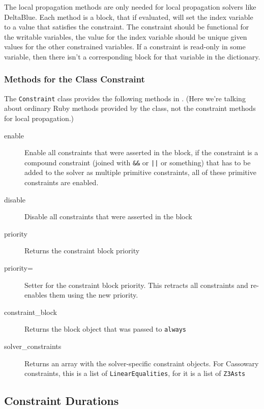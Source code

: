 The local propagation methods are only needed for local propagation
solvers like DeltaBlue.  Each method is a block, that if evaluated,
will set the index variable to a value that satisfies the constraint.
The constraint should be functional for the writable variables, \ie
the value for the index variable should be unique given values for the
other constrained variables.  If a constraint is read-only in some
variable, then there isn't a corresponding block for that variable in
the dictionary.



\subsubsection{Methods for the Class Constraint}
\label{sec:methods-class-constraint}

The \lstinline{Constraint} class provides the following methods in
\toolname.  (Here we're talking about ordinary Ruby methods provided
by the class, not the constraint methods for local propagation.)

\begin{description}
\item[enable] Enable all constraints that were asserted in the block,
  \ie if the constraint is a compound constraint (joined with
  \lstinline{&&} or \lstinline{||} or something) that has to be added
  to the solver as multiple primitive constraints, all of these
  primitive constraints are enabled.
\item[disable] Disable all constraints that were asserted in the block
\item[priority] Returns the constraint block priority
\item[priority=] Setter for the constraint block priority. This
  retracts all constraints and re-enables them using the new priority.
\item[constraint\_block] Returns the block object that was passed to
  \lstinline{always}
\item[solver\_constraints] Returns an array with the solver-specific
  constraint objects. For Cassowary constraints, this is a list of
  \lstinline{LinearEqualities}, for \zthree it is a list of
  \lstinline{Z3Asts}
\end{description}

\subsection{Constraint Durations}
\label{sec:constraint-durations}

